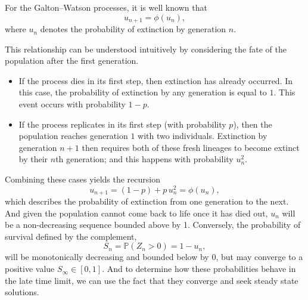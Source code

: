 \documentclass[11pt]{article}
\begin{document}
\noindent
For the Galton--Watson processes, it is well known that
\[
u_{n+1} = \phi(u_n),
\]
where $u_n$ denotes the probability of extinction by generation $n$.

This relationship can be understood intuitively by considering the fate of the
population after the first generation.

\begin{itemize}
    \item If the process dies in its first step, then extinction has already
    occurred. In this case, the probability of extinction by any generation is
    equal to $1$. This event occurs with probability $1-p$.
    \item If the process replicates in its first step (with probability $p$), then the population
    reaches generation $1$ with two individuals. Extinction by generation $n+1$
    then requires both of these fresh lineages to become extinct by their $n$th generation; and this happens with probability $u_n^2$.
\end{itemize}

\noindent
Combining these cases yields the recursion
\begin{equation}
u_{n+1} = (1-p) + p\, u_n^2 = \phi(u_n),
\label{eq:unrec}
\end{equation}
which describes the probability of extinction from one generation to the next. And given the population cannot come
back to life once it has died out, $u_n$ will be a non-decreasing sequence bounded above by 1. Conversely, the probability of survival
defined by the complement, $$ S_n = \mathbb{P}(Z_n > 0)  = 1-u_n,$$ will be monotonically decreasing and bounded below by 0, but may converge to a positive value $S_\infty \in [0,1]$.
And to determine how these probabilities behave in the late time limit, we can use the fact that they converge and seek steady state solutions.
\end{document}
